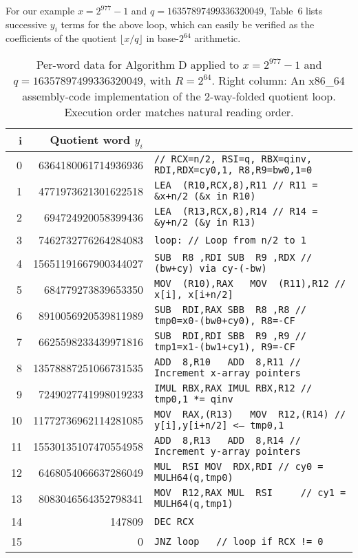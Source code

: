 \documentclass{article}
\begin{document}
For our example $x = 2^{977}-1$ and $q = 16357897499336320049$, Table~6 lists successive $y_i$ terms for the above loop, which can easily be verified as the coefficients of the quotient $\lfloor x/q \rfloor$ in base-$2^{64}$ arithmetic.
\begin{table}
\begin{center}
\label{table_d}
\caption{Per-word data for Algorithm D applied to $x = 2^{977}-1$ and $q = 16357897499336320049$, with $R=2^{64}$. Right column: An x86\_64 assembly-code implementation of the 2-way-folded quotient loop. Execution order matches natural reading order.}
\begin{tabular}{r|r| l}
i	&Quotient word $y_i$\qquad\qquad	&	\\
\hline
	 0	& 6364180061714936936	&	{\tt // RCX=n/2, RSI=q, RBX=qinv, RDI,RDX=cy0,1, R8,R9=bw0,1=0}\\
	 1	& 4771973621301622518	&	{\tt	LEA	\ (R10,RCX,8),R11	\qquad	// R11 = \&x+n/2 (\&x in R10)}\\
	 2	&  694724920058399436	&	{\tt	LEA	\ (R13,RCX,8),R14	\qquad	// R14 = \&y+n/2 (\&y in R13)}\\
	 3	& 7462732776264284083	&	{\tt loop:						\qquad	// Loop from n/2 to 1}\\
	 4	&15651191667900344027	&	{\tt	SUB \ R8 ,RDI			\qquad	SUB \ R9 ,RDX	// (bw+cy) via cy-(-bw)}\\
	 5	&  684779273839653350	&	{\tt	MOV \ (R10),RAX			\ \ 	MOV \ (R11),R12	// x[i], x[i+n/2]}\\
	 6	& 8910056920539811989	&	{\tt	SUB \ RDI,RAX			\qquad	SBB \ R8 ,R8 	// tmp0=x0-(bw0+cy0), R8=-CF}\\
	 7	& 6625598233439971816	&	{\tt	SUB \ RDI,RDI			\qquad	SBB \ R9 ,R9 	// tmp1=x1-(bw1+cy1), R9=-CF}\\
	 8	&13578887251066731535	&	{\tt	ADD \ 8,R10				\qquad\ \ 	ADD \ 8,R11		// Increment x-array pointers}\\
	 9	& 7249027741998019233	&	{\tt	IMUL\ RBX,RAX			\qquad	IMUL\ RBX,R12	// tmp0,1 *= qinv}\\
	10	&11772736962114281085	&	{\tt	MOV \ RAX,(R13)			\ \ 	MOV \ R12,(R14)	// y[i],y[i+n/2] <-- tmp0,1}\\
	11	&15530135107470554958	&	{\tt	ADD \ 8,R13				\qquad\ \ 	ADD \ 8,R14		// Increment y-array pointers}\\
	12	& 6468054066637286049	&	{\tt	MUL \ RSI		\qquad	\qquad	MOV \ RDX,RDI	// cy0 = MULH64(q,tmp0)}\\
	13	& 8083046564352798341	&	{\tt	MOV \ R12,RAX			\qquad	MUL \ RSI\ \ \ \ \ // cy1 = MULH64(q,tmp1)}\\
	14	&              147809	&	{\tt DEC RCX	}\\
	15	&                   0	&	{\tt JNZ loop					\ \ 	// loop if RCX != 0}\\
\end{tabular}
\end{center}
\end{table}
\end{document}
